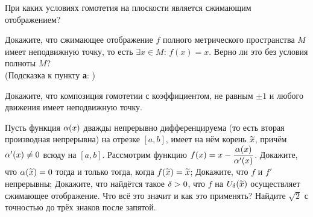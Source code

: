 \documentclass[a4paper,12pt]{article}
\begin{document}
При каких условиях гомотетия на плоскости является сжимающим отображением?

Докажите, что сжимающее отображение $f$ полного метрического пространства $M$ имеет неподвижную точку, то есть $\exi x\in M$: $f(x)=x$.
Верно ли это без условия полноты $M$?\\
(Подсказка к пункту \textbf{а}:\,\,{})

Докажите, что композиция гомотетии с коэффициентом, не равным $\pm 1$ и любого движения имеет неподвижную точку.

Пусть функция $\alpha(x)$ дважды непрерывно дифференцируема (то есть вторая производная непрерывна) на отрезке $[a,b]$, имеет на нём корень $\widetilde{x}$, причём $\alpha'(x)\ne0$ всюду на $[a,b]$.
Рассмотрим функцию $f(x) =  x - \dfrac{\alpha(x)}{\alpha'(x)}$.
Докажите, что $\alpha(\widetilde{x}) = 0$ тогда и только тогда, когда $f(\widetilde{x})=\widetilde{x}$;
Докажите, что $f$ и $f'$ непрерывны;
Докажите, что найдётся такое $\delta>0$, что $f$ на $U_\delta(\widetilde{x})$ осуществляет сжимающее отображение.
Что всё это значит и как это применять?
Найдите $\sqrt{2}$ с точностью до трёх знаков после запятой.

{}
\end{document}
